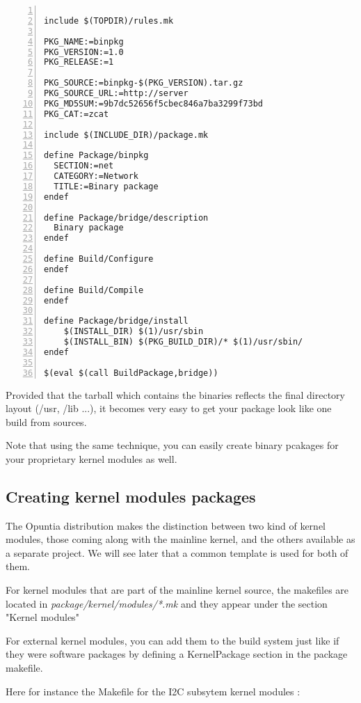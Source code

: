 \begin{Verbatim}[frame=single,numbers=left]

include $(TOPDIR)/rules.mk

PKG_NAME:=binpkg
PKG_VERSION:=1.0
PKG_RELEASE:=1

PKG_SOURCE:=binpkg-$(PKG_VERSION).tar.gz
PKG_SOURCE_URL:=http://server
PKG_MD5SUM:=9b7dc52656f5cbec846a7ba3299f73bd
PKG_CAT:=zcat

include $(INCLUDE_DIR)/package.mk

define Package/binpkg
  SECTION:=net
  CATEGORY:=Network
  TITLE:=Binary package
endef

define Package/bridge/description
  Binary package
endef

define Build/Configure
endef

define Build/Compile
endef

define Package/bridge/install
    $(INSTALL_DIR) $(1)/usr/sbin
    $(INSTALL_BIN) $(PKG_BUILD_DIR)/* $(1)/usr/sbin/
endef

$(eval $(call BuildPackage,bridge))
\end{Verbatim}

Provided that the tarball which contains the binaries reflects the final
directory layout (/usr, /lib ...), it becomes very easy to get your package
look like one build from sources.

Note that using the same technique, you can easily create binary pcakages
for your proprietary kernel modules as well.

\subsection{Creating kernel modules packages}

The Opuntia distribution makes the distinction between two kind of kernel modules, those coming along with the mainline kernel, and the others available as a separate project. We will see later that a common template is used for both of them.

For kernel modules that are part of the mainline kernel source, the makefiles are located in \textit{package/kernel/modules/*.mk} and they appear under the section "Kernel modules"

For external kernel modules, you can add them to the build system just like if they were software packages by defining a KernelPackage section in the package makefile.

Here for instance the Makefile for the I2C subsytem kernel modules :

